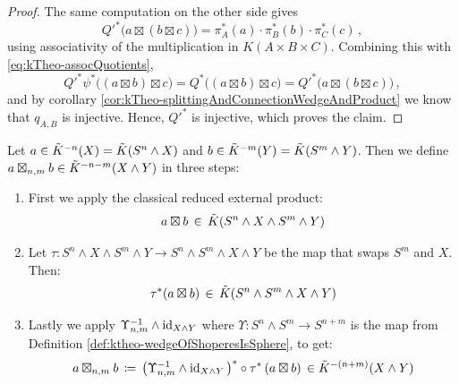 \begin{proof}
		The same computation on the other side gives
	\begin{equation*}
		Q'^{*}\bigl(a\boxtimes(b\boxtimes c)\bigr)=\pi_A^{*}(a)\cdot\pi_B^{*}(b)\cdot\pi_C^{*}(c)\,,
	\end{equation*}
	using associativity of the multiplication in $K(A\times B\times C)$. Combining
	this with \eqref{eq:kTheo-assocQuotients},
	\begin{equation*}
		Q'^{*}\psi^{*}\bigl((a\boxtimes b)\boxtimes c\bigr)
		=Q^{*}\bigl((a\boxtimes b)\boxtimes c\bigr)
		=Q'^{*}\bigl(a\boxtimes(b\boxtimes c)\bigr)\,,
	\end{equation*}
	and by corollary \ref{cor:kTheo-splittingAndConnectionWedgeAndProduct} we know that $q_{A,B}$ is injective. Hence, $Q'^{*}$ is injective, which proves the claim.
\end{proof}

\begin{definition} \label{def:kTheo-lowerExternalProduct}

	Let $a\in \tilde{K}^{-n}(X)=\tilde{K}(S^n\wedge X)$ and $b\in \tilde{K}^{-m}(Y)=\tilde{K}(S^m\wedge Y)$. 
	Then we define $a\boxtimes_{n,m}b\in \tilde{K}^{-n-m}(X\wedge Y)$ in three steps:
	\begin{enumerate}
		\item First we apply the classical reduced external product:
		\begin{equation*}
			a\boxtimes b \,\in \,\tilde{K}(S^n\wedge X\wedge S^m\wedge Y)
		\end{equation*}
		\item Let $\tau: S^n\wedge X\wedge S^m\wedge Y \to S^n\wedge  S^m\wedge X \wedge Y$ be the map that swaps $S^m$ and $X$. Then:
			\begin{equation*}
				\tau^*(a\boxtimes b)\,\in\,\tilde{K}(S^n\wedge  S^m\wedge X\wedge Y)
			\end{equation*}
		\item Lastly we apply $\Upsilon_{n,m}^{-1}\wedge\operatorname{\mathrm{id}}_{X\wedge Y}$ where $\Upsilon:S^n\wedge S^m\to S^{n+m}$ is the map from Definition \ref{def:ktheo-wedgeOfShoperesIsSphere}, to get:
			\begin{equation*}
				a\boxtimes_{n,m}b\,\coloneq\, \big(\Upsilon_{n,m}^{-1}\wedge\operatorname{\mathrm{id}}_{X\wedge Y}\big)^*\circ  \tau^* \,(a\boxtimes b) \,\in \tilde{K}^{-(n+m)}(X\wedge Y)
			\end{equation*}
	\end{enumerate}
\end{definition}

